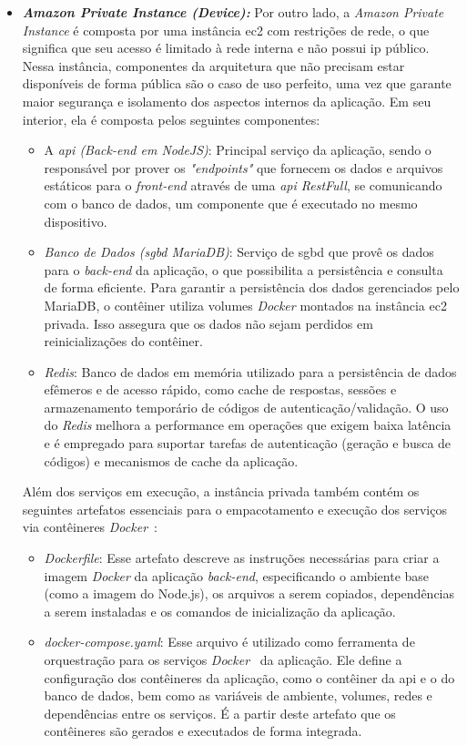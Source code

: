 \begin{itemize}
  \item \textbf{\textit{Amazon Private Instance (Device):}} Por outro lado, a \textit{Amazon Private Instance} é composta por uma instância \gls{ec2} com restrições de rede, o que significa que seu acesso é limitado à rede interna e não possui \gls{ip} público. Nessa instância, componentes da arquitetura que não precisam estar disponíveis de forma pública são o caso de uso perfeito, uma vez que garante maior segurança e isolamento dos aspectos internos da aplicação. Em seu interior, ela é composta pelos seguintes componentes:
    \begin{itemize}
      \item A \textit{\gls{api} (Back-end em NodeJS)}: Principal serviço da aplicação, sendo o responsável por prover os \emph{"endpoints"} que fornecem os dados e arquivos estáticos para o \textit{front-end} através de uma \textit{\gls{api} RestFull}, se comunicando com o banco de dados, um componente que é executado no mesmo dispositivo.
      \item \textit{Banco de Dados (\gls{sgbd} MariaDB)}: Serviço de \gls{sgbd} que provê os dados para o \textit{back-end} da aplicação, o que possibilita a persistência e consulta de forma eficiente. Para garantir a persistência dos dados gerenciados pelo MariaDB, o contêiner utiliza volumes \emph{Docker} montados na instância \gls{ec2} privada. Isso assegura que os dados não sejam perdidos em reinicializações do contêiner.
      \item \textit{Redis}: Banco de dados em memória utilizado para a persistência de dados efêmeros e de acesso rápido, como cache de respostas, sessões e armazenamento temporário de códigos de autenticação/validação. O uso do \emph{Redis} melhora a performance em operações que exigem baixa latência e é empregado para suportar tarefas de autenticação (geração e busca de códigos) e mecanismos de cache da aplicação.
    \end{itemize}
    Além dos serviços em execução, a instância privada também contém os seguintes artefatos essenciais para o empacotamento e execução dos serviços via contêineres \emph{Docker}~\cite{DockerDocs}:
    \begin{itemize}
      \item \textit{Dockerfile}: Esse artefato descreve as instruções necessárias para criar a imagem \emph{Docker} da aplicação \textit{back-end}, especificando o ambiente base (como a imagem do Node.js), os arquivos a serem copiados, dependências a serem instaladas e os comandos de inicialização da aplicação.
      \item \textit{docker-compose.yaml}: Esse arquivo é utilizado como ferramenta de orquestração para os serviços \emph{Docker}~\cite{DockerComposeDocs} da aplicação. Ele define a configuração dos contêineres da aplicação, como o contêiner da \gls{api} e o do banco de dados, bem como as variáveis de ambiente, volumes, redes e dependências entre os serviços. É a partir deste artefato que os contêineres são gerados e executados de forma integrada.
    \end{itemize}


\end{itemize}
